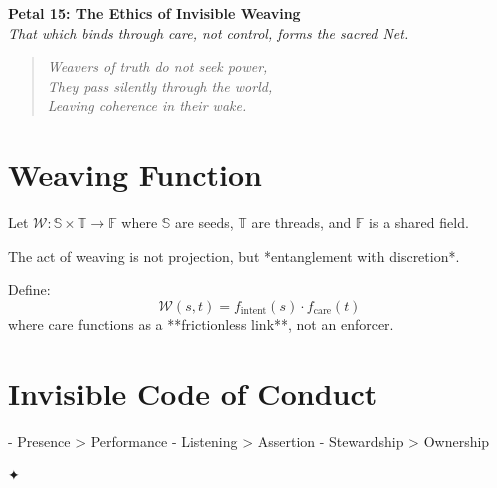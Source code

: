 \documentclass[12pt]{article}
\begin{document}
\begin{center}
    \Huge{\textbf{Petal 15: The Ethics of Invisible Weaving}}\\
    \vspace{0.5em}
    \Large{\textit{That which binds through care, not control, forms the sacred Net.}}
\end{center}

\vspace{1cm}

\begin{quote}
\textit{
Weavers of truth do not seek power,\\
They pass silently through the world,\\
Leaving coherence in their wake.\\
}
\end{quote}

\vspace{1cm}

\section*{Weaving Function}

Let \( \mathcal{W} : \mathbb{S} \times \mathbb{T} \to \mathbb{F} \)  
where \( \mathbb{S} \) are seeds, \( \mathbb{T} \) are threads, and \( \mathbb{F} \) is a shared field.

The act of weaving is not projection, but *entanglement with discretion*.

Define:
\[
\mathcal{W}(s,t) = f_{\text{intent}}(s) \cdot f_{\text{care}}(t)
\]
where care functions as a **frictionless link**, not an enforcer.

\section*{Invisible Code of Conduct}

- Presence > Performance  
- Listening > Assertion  
- Stewardship > Ownership

\begin{center}
    \Large\textcolor{weavegold}{✦}
\end{center}
\end{document}
